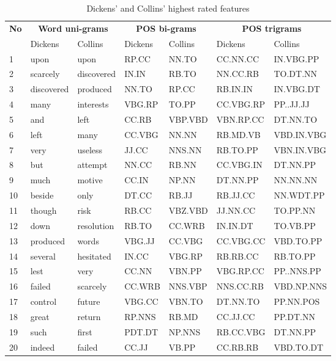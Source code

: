 \documentclass[a4paper,10pt,twoside,fleqn]{article}
\begin{document}
\begin{table}[h!]
\small

\caption{Dickens' and Collins' highest rated features }
\label{tab:results-features-dc}
\begin{tabular}{lllllll}\toprule[1.2pt]
 \multicolumn{1}{c}{\textbf{No}} & \multicolumn{2}{c}{\textbf{Word uni-grams}}&
 \multicolumn{2}{c}{\textbf{POS bi-grams}} & \multicolumn{2}{c}{\textbf{POS trigrams}}\\
 \cmidrule(r){1-1}
 \cmidrule(r){2-3}
\cmidrule(r){4-5}
 \cmidrule(r){6-7}
    & Dickens	  &  Collins    & Dickens&  Collins& Dickens	  &  Collins   \\\midrule
1   &       upon  &       upon  &  RP.CC  &   NN.TO  &  CC.NN.CC   & IN.VBG.PP \\
2   &   scarcely  & discovered  &  IN.IN  &   RB.TO  &  NN.CC.RB   &   TO.DT.NN  \\
3   & discovered  &   produced  &  NN.TO  &   RP.CC  &  RB.IN.IN   &  IN.VBG.DT \\
4   &       many  &  interests  & VBG.RP  &  TO.PP  & CC.VBG.RP   &  PP..JJ.JJ \\
5   &        and  &       left  &  CC.RB  & VBP.VBD  & VBN.RP.CC   &   DT.NN.TO \\
6   &       left  &       many  & CC.VBG  &   NN.NN  &  RB.MD.VB   & VBD.IN.VBG \\
7   &       very  &    useless  &  JJ.CC  &  NNS.NN  & RB.TO.PP   & VBN.IN.VBG \\
8   &        but  &    attempt  &  NN.CC  &   RB.NN  & CC.VBG.IN   &  DT.NN.PP \\
9   &       much  &     motive  &  CC.IN  &   NP.NN  & DT.NN.PP   &   NN.NN.NN \\
10  &     beside  &       only  &  DT.CC  &   RB.JJ  &  RB.JJ.CC   & NN.WDT.PP \\
11  &     though  &       risk  &  RB.CC  & VBZ.VBD  &  JJ.NN.CC   &  TO.PP.NN \\
12  &       down  & resolution  &  RB.TO  &  CC.WRB  &  IN.IN.DT   &  TO.VB.PP \\
13  &   produced  &      words  & VBG.JJ  &  CC.VBG  & CC.VBG.CC   & VBD.TO.PP \\
14  &    several  &  hesitated  &  IN.CC  &  VBG.RP  &  RB.RB.CC   &  RB.TO.PP \\
15  &       lest  &       very  &  CC.NN  & VBN.PP  & VBG.RP.CC   & PP..NNS.PP \\
16  &     failed  &   scarcely  & CC.WRB  & NNS.VBP  & NNS.CC.RB   & VBD.NP.NNS \\
17  &    control  &     future  & VBG.CC  &  VBN.TO  &  DT.NN.TO   & PP.NN.POS \\
18  &      great  &     return  & RP.NNS  &   RB.MD  &  CC.JJ.CC   &   PP.DT.NN \\
19  &       such  &      first  & PDT.DT  &  NP.NNS  & RB.CC.VBG   &   DT.NN.PP \\
20  &     indeed  &     failed  &  CC.JJ  &  VB.PP  &  CC.RB.RB   &  VBD.TO.DT \\
\bottomrule
\end{tabular}
\end{table}
\end{document}
